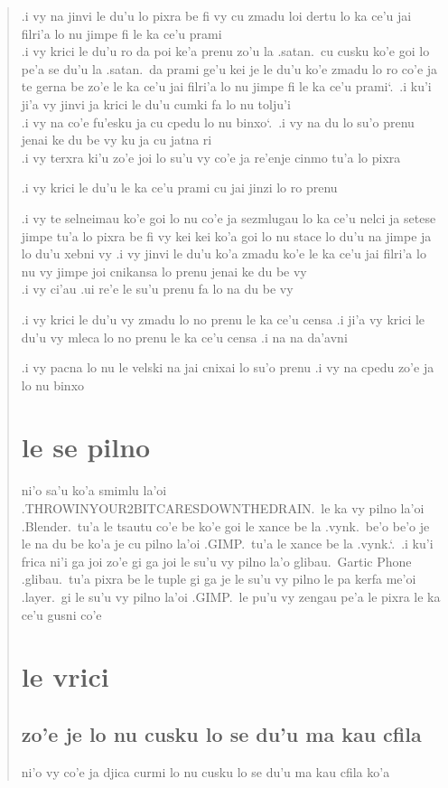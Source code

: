 \documentclass{report}
\newcommand\sds{\spacefactor\sfcode`.\ \space}
\begin{document}
\begin{quote}
	.i vy na jinvi le du'u lo pixra be fi vy cu zmadu loi dertu lo ka ce'u jai filri'a lo nu jimpe fi le ka ce'u prami\\
	.i vy krici le du'u ro da poi ke'a prenu zo'u la .satan.\ cu cusku ko'e goi lo pe'a se du'u la .satan.\ da prami ge'u kei je le du'u ko'e zmadu lo ro co'e ja te gerna be zo'e le ka ce'u jai filri'a lo nu jimpe fi le ka ce'u prami\sds  .i ku'i ji'a vy jinvi ja krici le du'u cumki fa lo nu tolju'i\\
	.i vy na co'e fu'esku ja cu cpedu lo nu binxo\sds  .i vy na du lo su'o prenu jenai ke du be vy ku ja cu jatna ri\\
	.i vy terxra ki'u zo'e joi lo su'u vy co'e ja re'enje cinmo tu'a lo pixra

	.i vy krici le du'u le ka ce'u prami cu jai jinzi lo ro prenu

	.i vy te selneimau ko'e goi lo nu co'e ja sezmlugau lo ka ce'u nelci ja setese jimpe tu'a lo pixra be fi vy kei kei ko'a goi lo nu stace lo du'u na jimpe ja lo du'u xebni vy  .i vy jinvi le du'u ko'a zmadu ko'e le ka ce'u jai filri'a lo nu vy jimpe joi cnikansa lo prenu jenai ke du be vy\\
	.i vy ci'au .ui re'e le su'u prenu fa lo na du be vy

	.i vy krici le du'u vy zmadu lo no prenu le ka ce'u censa  .i ji'a vy krici le du'u vy mleca lo no prenu le ka ce'u censa  .i na na da'avni

	.i vy pacna lo nu le velski na jai cnixai lo su'o prenu  .i vy na cpedu zo'e ja lo nu binxo

	\section{le se pilno}
	ni'o sa'u ko'a smimlu la'oi .THROWINYOUR2BITCARESDOWNTHEDRAIN.\ le ka vy pilno la'oi .Blender.\ tu'a le tsautu co'e be ko'e goi le xance be la .vynk.\ be'o be'o je le na du be ko'a je cu pilno la'oi .GIMP.\ tu'a le xance be la .vynk.\sds  .i ku'i frica ni'i ga joi zo'e gi ga joi le su'u vy pilno la'o glibau.\ Gartic Phone .glibau.\ tu'a pixra be le tuple gi ga je le su'u vy pilno le pa kerfa me'oi .layer.\ gi le su'u vy pilno la'oi .GIMP.\ le pu'u vy zengau pe'a le pixra le ka ce'u gusni co'e

	\section{le vrici}
	\subsection{zo'e je lo nu cusku lo se du'u ma kau cfila}
	ni'o vy co'e ja djica curmi lo nu cusku lo se du'u ma kau cfila ko'a


\end{quote}
\end{document}
